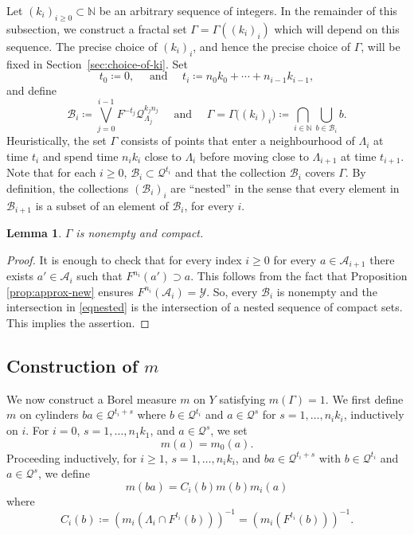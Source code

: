 \documentclass[english, 10pt]{amsart}
\numberwithin{equation}{section}
\theoremstyle{definition}
\theoremstyle{plain}
\newtheorem{lemma}[definition]{Lemma}
\theoremstyle{plain}
\theoremstyle{definition}
\theoremstyle{definition}
\theoremstyle{plain}
\theoremstyle{definition}
\newcommand{\quand}{\quad\text{ and } \quad}
\newcommand{\cY}{{\mathcal Y}}
\newcommand{\cA}{{\mathcal A}}
\newcommand{\cB}{{\mathcal B}}
\newcommand{\cQ}{{\mathcal Q}}
\newcommand{\N}{{\mathbb N}}
\newcommand{\eqdef}{\coloneqq}
\newcommand{\bN}{\N}
\numberwithin{equation}{section}
\begin{document}
Let $(k_{ i })_{i \ge 0} \subset \N$ be an arbitrary sequence of integers.
In the remainder of this subsection, we construct a fractal set $\Gamma = \Gamma ( (k_i)_i )$ which will depend on this sequence. The precise choice of $(k_i)_{i}$, and hence the precise choice of $\Gamma$, will  be fixed in Section~\ref{sec:choice-of-ki}.
Set
\[
  t_{ 0 } \eqdef 0,
  \quand
  t_{ i } \eqdef
  n_0 k_0+\cdots+n_{i-1}k_{i-1}
  ,
\]
and define
\begin{equation}\label{eqnested}
  \cB_{ i } \eqdef \bigvee_{ j = 0 }^{ i - 1 } F^{ -t_{ j } } \cQ_{\Lambda_{ j }}^{ k_j n_j }
  \quand
  \Gamma
  =
  \Gamma\big((k_i)_i\big)
  \eqdef
  \bigcap_{ i \in\bN }
  \bigcup_{ b \in \cB_{i} } b 
  .
\end{equation}
Heuristically, the set $\Gamma$ consists of points that enter a neighbourhood of $\Lambda_i$ at time $t_i$ and spend time $n_ik_i$ close to $\Lambda_i$ before moving close to $\Lambda_{i+1}$ at time $t_{i+1}$.
Note that for each $i\ge 0$, $\cB_{ i } \subset \cQ^{ t_{ i } }$ and that the collection $\cB_{ i }$ covers $\Gamma$. By definition, the collections $(\cB_i)_i$ are ``nested'' in the sense that every element in $\cB_{i+1}$ is a subset of an element of $\cB_i$, for every $i$.

\begin{lemma}\label{lem:nonempty-compact}
	$\Gamma$ is nonempty and compact.
\end{lemma}

\begin{proof}
	It is enough to check that for every index $i\ge 0$ for every $a\in\cA_{i+1}$ there exists $a'\in\cA_i$ such that $F^{n_i}(a')\supset a$. This follows from the fact that  Proposition \ref{prop:approx-new} ensures  $F^{n_i} ( \cA_i ) = \cY$. So, every $\cB_i$ is nonempty and the intersection in \eqref{eqnested} is the intersection of a nested sequence of compact sets. This implies the assertion.
\end{proof}

\subsection{Construction of $m$}\label{sec:const-m}

We now  construct a Borel measure $m$ on $Y$ satisfying $m ( \Gamma ) =1$. We first define $m$ on cylinders $b a \in \cQ^{t_i + s}$ where $b\in \cQ^{t_i}$ and $a \in \cQ^{s}$ for $s = 1,\ldots,n_{i}k_{i}$, inductively on $i$.
For $i = 0$, $s =1,\ldots,n_1 k_1$, and $a \in\cQ^s$, we set
\[
m(a) = m_0 (a).
\]
Proceeding inductively, for $i \ge 1$, $s=1,\ldots,n_{i}k_{i}$, and $b a \in \cQ^{t_i + s}$ with $b \in \cQ^{t_i}$ and $a\in \cQ^s$, we define
\begin{equation}\label{eq:def-m-new}
  m(ba) = C_i(b) m(b) m_i (a)
\end{equation}
where
\begin{equation}
  C_{i} (b) \eqdef
  \left(
    m_i (
    \Lambda_i \cap
    F^{t_i} (b))
  \right)^{-1}
  =
    \left(
    m_i (
    F^{t_i} (b))
  \right)^{-1}.
\end{equation}
\end{document}

